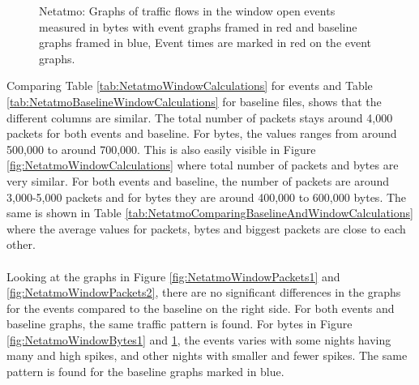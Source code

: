 \begin{figure}[H]
\begin{subfigure}[b]{0.47\textwidth}
        \centering
    \end{subfigure}
        \begin{subfigure}[b]{0.47\textwidth}
        \centering
    \end{subfigure}
    \begin{subfigure}[b]{0.47\textwidth}
        \centering
    \end{subfigure}
    \begin{subfigure}[b]{0.47\textwidth}
        \centering
    \end{subfigure}
    \hspace{0.6cm}
    \begin{subfigure}[b]{0.47\textwidth}
    \centering
        \end{subfigure}
    \caption{Netatmo: Graphs of traffic flows in the window open events measured in bytes with event graphs framed in red and baseline graphs framed in blue, Event times are marked in red on the event graphs.}  
    \label{fig:NetatmoWindowBytes2}
\end{figure}

Comparing Table \ref{tab:NetatmoWindowCalculations} for events and Table \ref{tab:NetatmoBaselineWindowCalculations} for baseline files, shows that the different columns are similar. The total number of packets stays around 4,000 packets for both events and baseline. For bytes, the values ranges from around 500,000 to around 700,000. This is also easily visible in Figure \ref{fig:NetatmoWindowCalculations} where total number of packets and bytes are very similar. For both events and baseline, the number of packets are around 3,000-5,000 packets and for bytes they are around 400,000 to 600,000 bytes. The same is shown in Table \ref{tab:NetatmoComparingBaselineAndWindowCalculations} where the average values for packets, bytes and biggest packets are close to each other. 
\\\\
Looking at the graphs in Figure \ref{fig:NetatmoWindowPackets1} and \ref{fig:NetatmoWindowPackets2}, there are no significant differences in the graphs for the events compared to the baseline on the right side. For both events and baseline graphs, the same traffic pattern is found. For bytes in Figure \ref{fig:NetatmoWindowBytes1} and \ref{fig:NetatmoWindowBytes2}, the events varies with some nights having many and high spikes, and other nights with smaller and fewer spikes. The same pattern is found for the baseline graphs marked in blue.  

